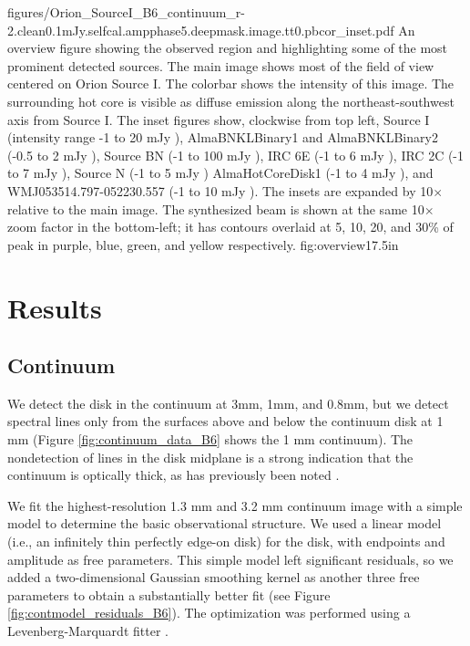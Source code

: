 \documentclass[twocolumn]{aastex61}
\begin{document}
\Figure
{figures/Orion_SourceI_B6_continuum_r-2.clean0.1mJy.selfcal.ampphase5.deepmask.image.tt0.pbcor_inset.pdf}
{An overview figure showing the observed region and highlighting some of
the most prominent detected sources.
The main image shows most of the field of view centered on Orion Source I.
The colorbar shows the intensity of this image.
The surrounding hot core is visible as diffuse emission along the northeast-southwest
axis from Source I.
The inset figures show, clockwise from top left, 
Source I (intensity range -1 to 20 mJy \perbeam),
AlmaBNKLBinary1 and AlmaBNKLBinary2 (-0.5 to 2 mJy \perbeam),
Source BN (-1 to 100 mJy \perbeam),
IRC 6E (-1 to 6 mJy \perbeam),
IRC 2C (-1 to 7 mJy \perbeam),
Source N (-1 to 5 mJy \perbeam)
AlmaHotCoreDisk1  (-1 to 4 mJy \perbeam),
and
WMJ053514.797-052230.557 (-1 to 10 mJy \perbeam).
The insets are expanded by 10$\times$ relative to the main image.
The synthesized beam is shown at the same 10$\times$ zoom factor in the
bottom-left; it has contours overlaid at 5, 10, 20, and 30\% of peak
in purple, blue, green, and yellow respectively.
}
{fig:overview}{1}{7.5in}

\section{Results}

\subsection{Continuum}
We detect the disk in the continuum at 3mm, 1mm, and 0.8mm, but we detect
spectral lines only from the surfaces above and below the continuum disk at 1
mm (Figure \ref{fig:continuum_data_B6} shows the 1 mm continuum).  The nondetection of
lines in the disk midplane is a strong indication that the continuum is
optically thick, as has previously been noted
\citep[e.g.][]{Plambeck2016a}.

We fit the highest-resolution 1.3 mm and 3.2 mm continuum image with a simple
model to determine the basic
observational structure.  We used a linear model (i.e., an infinitely thin
perfectly edge-on disk) for the disk, with endpoints and amplitude as free parameters.
This simple model left significant residuals, so we added a two-dimensional
Gaussian smoothing kernel as another three free parameters to obtain a
substantially better fit (see Figure \ref{fig:contmodel_residuals_B6}).
The optimization was performed using a Levenberg-Marquardt
fitter \citep{Newville2014a}. %
\end{document}
